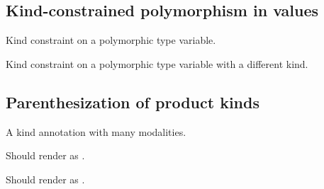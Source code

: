 \subsection{Kind-constrained polymorphism in values\label{Oxcaml--kind-constrained-polymorphism-in-values}}%
\label{Oxcaml--val-poly_immediate}\begin{ocamlindent}Kind constraint on a polymorphic type variable.\end{ocamlindent}%
\medbreak
\label{Oxcaml--val-poly_float64}\begin{ocamlindent}Kind constraint on a polymorphic type variable with a different kind.\end{ocamlindent}%
\medbreak
\subsection{Parenthesization of product kinds\label{Oxcaml--parenthesization-of-product-kinds}}%
\label{Oxcaml--type-t_many_modalities}\begin{ocamlindent}A  kind annotation with many modalities.\end{ocamlindent}%
\medbreak
\label{Oxcaml--type-t_outer_mod}\begin{ocamlindent}Should render as .\end{ocamlindent}%
\medbreak
\label{Oxcaml--type-t_inner_mod}\begin{ocamlindent}Should render as .\end{ocamlindent}%
\medbreak
